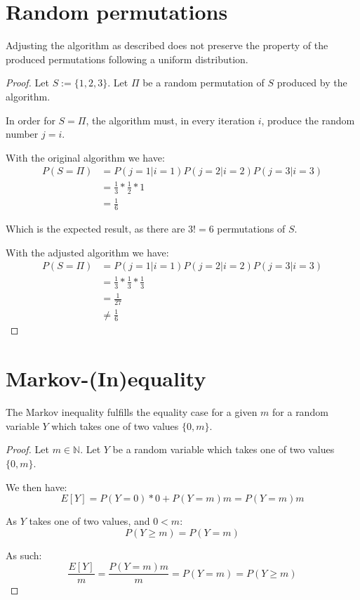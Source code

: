 \documentclass[a4paper]{scrreprt}
\begin{document}
\section{Random permutations}

Adjusting the algorithm as described does not preserve the property of the
produced permutations following a uniform distribution.

\begin{proof}
	Let $S := \{1, 2, 3\}$. Let $\Pi$ be a random permutation of $S$
	produced by the algorithm.
	
	In order for $S = \Pi$, the algorithm must, in every iteration $i$,
	produce the random number $j = i$.

	With the original algorithm we have:
	\begin{align*}
		P(S = \Pi) & = P(j = 1 | i = 1) P(j = 2 | i = 2) P(j = 3 | i = 3) \\
		& = \frac{1}{3} * \frac{1}{2} * 1 \\
		& = \frac{1}{6}
	\end{align*}

	Which is the expected result, as there are $3! = 6$ permutations of $S$.

	With the adjusted algorithm we have:
	\begin{align*}
		P(S = \Pi) & = P(j = 1 | i = 1) P(j = 2 | i = 2) P(j = 3 | i = 3) \\
		& = \frac{1}{3} * \frac{1}{3} * \frac{1}{3} \\
		& = \frac{1}{27} \\
		& \neq \frac{1}{6}
	\end{align*}
\end{proof}

\section{Markov-(In)equality}

The Markov inequality fulfills the equality case for a given $m$ for a random
variable $Y$ which takes one of two values $\{0, m\}$.

\begin{proof}
	Let $m \in \mathbb{N}$. Let $Y$ be a random variable which takes one of
	two values $\{0, m\}$.

	We then have:
	\[
		E[Y] = P(Y = 0) * 0 + P(Y = m) m = P(Y = m) m
	\]

	As $Y$ takes one of two values, and $0 < m$:
	\[
		P(Y \geq m) = P(Y = m)
	\]

	As such:
	\[
		\frac{E[Y]}{m} = \frac{P(Y = m) m}{m} = P(Y = m) = P(Y \geq m)
	\]
\end{proof}
\end{document}
